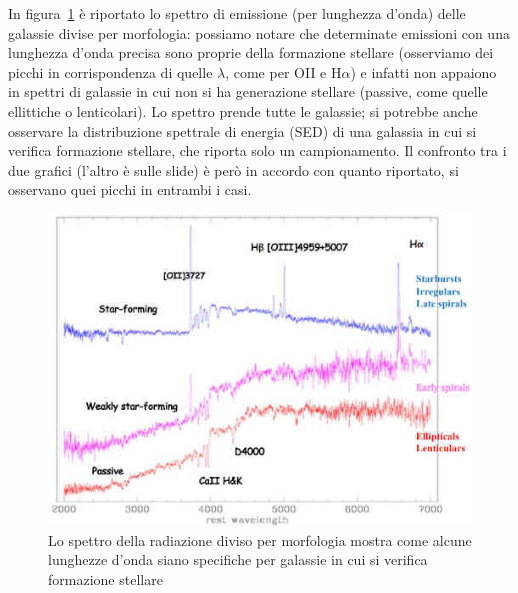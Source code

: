 In figura~\ref{fig:spettro+galassie} è riportato lo spettro di emissione (per lunghezza d'onda) delle galassie divise per morfologia: possiamo notare che determinate emissioni con una lunghezza d'onda precisa sono proprie della formazione stellare (osserviamo dei picchi in corrispondenza di quelle $\lambda$, come per OII e H$\alpha$) e infatti non appaiono in spettri di galassie in cui non si ha generazione stellare (passive, come quelle ellittiche o lenticolari). Lo spettro prende tutte le galassie; si potrebbe anche osservare la distribuzione spettrale di energia (SED) di una galassia in cui si verifica formazione stellare, che riporta solo un campionamento. Il confronto tra i due grafici (l'altro è sulle slide) è però in accordo con quanto riportato, si osservano quei picchi in entrambi i casi.

\begin{figure}
    \centering
    \includegraphics[width = 0.5 \textwidth]{immagini/spettro-galassie.jpg}
    \caption{Lo spettro della radiazione diviso per morfologia mostra come alcune lunghezze d'onda siano specifiche per galassie in cui si verifica formazione stellare}
    \label{fig:spettro+galassie}
\end{figure}

